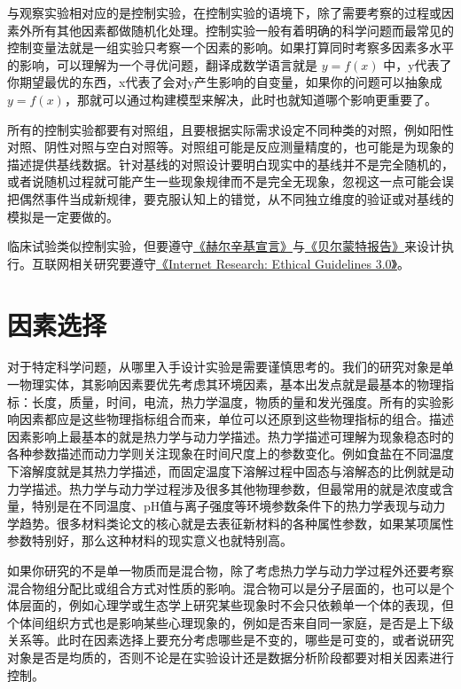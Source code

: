 \documentclass[]{tufte-book}
\begin{document}
与观察实验相对应的是控制实验，在控制实验的语境下，除了需要考察的过程或因素外所有其他因素都做随机化处理。控制实验一般有着明确的科学问题而最常见的控制变量法就是一组实验只考察一个因素的影响。如果打算同时考察多因素多水平的影响，可以理解为一个寻优问题，翻译成数学语言就是 \(y = f(x)\) 中，y代表了你期望最优的东西，x代表了会对y产生影响的自变量，如果你的问题可以抽象成 \(y = f(x)\)，那就可以通过构建模型来解决，此时也就知道哪个影响更重要了。

所有的控制实验都要有对照组，且要根据实际需求设定不同种类的对照，例如阳性对照、阴性对照与空白对照等。对照组可能是反应测量精度的，也可能是为现象的描述提供基线数据。针对基线的对照设计要明白现实中的基线并不是完全随机的，或者说随机过程就可能产生一些现象规律而不是完全无现象，忽视这一点可能会误把偶然事件当成新规律，要克服认知上的错觉，从不同独立维度的验证或对基线的模拟是一定要做的。

临床试验类似控制实验，但要遵守\href{https://zh.wikipedia.org/zh-cn/\%E8\%B5\%AB\%E7\%88\%BE\%E8\%BE\%9B\%E5\%9F\%BA\%E5\%AE\%A3\%E8\%A8\%80}{《赫尔辛基宣言》}与\href{https://zh.wikipedia.org/wiki/\%E8\%B4\%9D\%E5\%B0\%94\%E8\%92\%99\%E7\%89\%B9\%E6\%8A\%A5\%E5\%91\%8A}{《贝尔蒙特报告》}来设计执行。互联网相关研究要遵守\href{https://aoir.org/reports/ethics3.pdf}{《Internet Research: Ethical Guidelines 3.0》}。

\hypertarget{ux56e0ux7d20ux9009ux62e9}{%
\section{因素选择}\label{ux56e0ux7d20ux9009ux62e9}}

对于特定科学问题，从哪里入手设计实验是需要谨慎思考的。我们的研究对象是单一物理实体，其影响因素要优先考虑其环境因素，基本出发点就是最基本的物理指标：长度，质量，时间，电流，热力学温度，物质的量和发光强度。所有的实验影响因素都应是这些物理指标组合而来，单位可以还原到这些物理指标的组合。描述因素影响上最基本的就是热力学与动力学描述。热力学描述可理解为现象稳态时的各种参数描述而动力学则关注现象在时间尺度上的参数变化。例如食盐在不同温度下溶解度就是其热力学描述，而固定温度下溶解过程中固态与溶解态的比例就是动力学描述。热力学与动力学过程涉及很多其他物理参数，但最常用的就是浓度或含量，特别是在不同温度、pH值与离子强度等环境参数条件下的热力学表现与动力学趋势。很多材料类论文的核心就是去表征新材料的各种属性参数，如果某项属性参数特别好，那么这种材料的现实意义也就特别高。

如果你研究的不是单一物质而是混合物，除了考虑热力学与动力学过程外还要考察混合物组分配比或组合方式对性质的影响。混合物可以是分子层面的，也可以是个体层面的，例如心理学或生态学上研究某些现象时不会只依赖单一个体的表现，但个体间组织方式也是影响某些心理现象的，例如是否来自同一家庭，是否是上下级关系等。此时在因素选择上要充分考虑哪些是不变的，哪些是可变的，或者说研究对象是否是均质的，否则不论是在实验设计还是数据分析阶段都要对相关因素进行控制。
\end{document}
